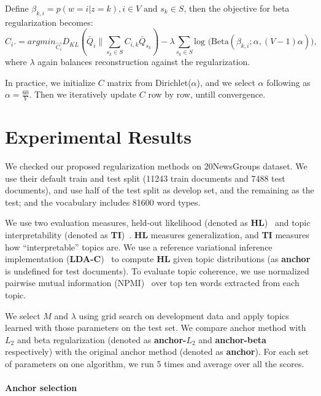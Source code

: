 \documentclass{article}
\providecommand{\citep}[1]{\cite{#1}}
\begin{document}
Define $\beta_{k,i} = p(w=i|z=k), \mbox{$i \in V$ and $s_k \in S$}$, then the objective for beta regularization becomes:
\begin{equation}
\label{eq:anchorbeta}
C_i. = argmin_{\vec{C_i}}D_{KL}(\bar{Q}_i \| \sum_{s_k \in S} C_{i,k} \bar{Q}_{s_k})- \lambda \sum_{s_k\in S}\mbox{log (Beta}(\beta_{k,i};\alpha,(V-1)\alpha)),
\end{equation}
where $\lambda$ again balances reconstruction against the regularization.

In practice, we initialize $C$ matrix from Dirichlet($\alpha$), and we select $\alpha$
following \cite{wallach-09b}  as $\alpha =\frac{60}{V}$. Then we iteratively update
$C$ row by row, untill convergence.

\section{Experimental Results}
\label{sec:experiments}

We checked our proposed regularization methods on 20NewsGroups dataset.  
We use their default train and test split (11243 train documents and 7488 test
documents), and use half of the test split as develop set, and the remaining as 
the test;
and the vocabulary includes 81600 word types.



We use two evaluation measures, held-out likelihood (denoted as {\bf
  HL})~\citep{blei-03} and topic interpretability (denoted as {\bf
  TI})~\citep{chang-09b,newman-10}.  {\bf HL} measures generalization, and {\bf
  TI} measures how ``interpretable'' topics are.  We use a reference variational
inference implementation ({\bf LDA-C})~\cite{blei-03} to compute {\bf HL} given
topic distributions (as {\bf anchor} is undefined for test documents). To
evaluate topic coherence, we use normalized pairwise mutual information (NPMI)~\citep{boumaunknownnormalized} over top ten words extracted from each topic.

We select $M$ and $\lambda$ using grid search on development data and apply
topics learned with those parameters on the test set. We compare anchor method
with $L_2$ and beta regularization (denoted as {\bf anchor-$L_2$} and {\bf
  anchor-beta} respectively) with the original anchor method (denoted as {\bf
  anchor}). For each set of parameters on one algorithm, we run 5 times and
average over all the scores.

\paragraph{Anchor selection}
\end{document}
